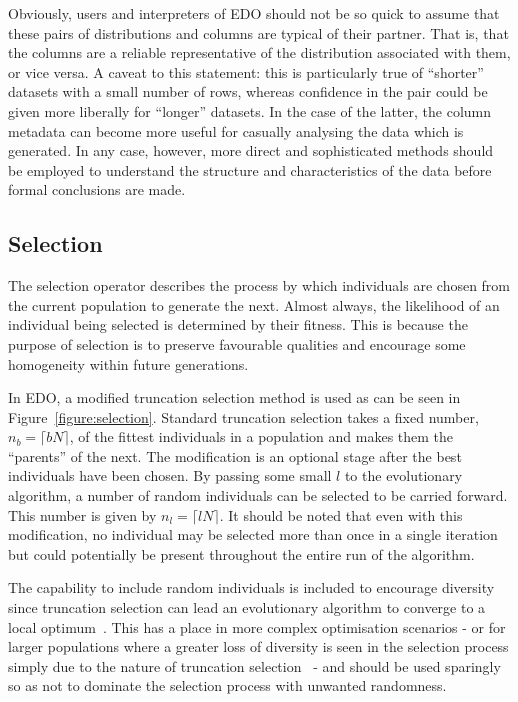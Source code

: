 Obviously, users and interpreters of EDO should not be so quick to assume that
these pairs of distributions and columns are typical of their partner. That is,
that the columns are a reliable representative of the distribution associated
with them, or vice versa. A caveat to this statement: this is particularly true
of ``shorter'' datasets with a small number of rows, whereas confidence in the
pair could be given more liberally for ``longer'' datasets. In the case of the
latter, the column metadata can become more useful for casually analysing the
data which is generated. In any case, however, more direct and sophisticated
methods should be employed to understand the structure and characteristics of
the data before formal conclusions are made.



\subsection{Selection}

The selection operator describes the process by which individuals are chosen
from the current population to generate the next. Almost always, the likelihood
of an individual being selected is determined by their fitness. This is because
the purpose of selection is to preserve favourable qualities and encourage some
homogeneity within future generations.


In EDO, a modified truncation selection method is used as can be seen in
Figure~\ref{figure:selection}. Standard truncation selection takes a fixed
number, \(n_b = \lceil bN\rceil\), of the fittest individuals in a population
and makes them the ``parents'' of the next. The modification is an optional
stage after the best individuals have been chosen. By passing some small \(l\)
to the evolutionary algorithm, a number of random individuals can be selected to
be carried forward. This number is given by \(n_l = \lceil lN \rceil\). It
should be noted that even with this modification, no individual may be selected
more than once in a single iteration but could potentially be present throughout
the entire run of the algorithm.



The capability to include random individuals is included to encourage
diversity since truncation selection can lead an evolutionary algorithm to
converge to a local optimum~\cite{Jebari2013}. This has a place in more complex
optimisation scenarios \-- or for larger populations where a greater loss of
diversity is seen in the selection process simply due to the nature of
truncation selection~\cite{Tatsuya2002} \-- and should be used sparingly so as
not to dominate the selection process with unwanted randomness.


